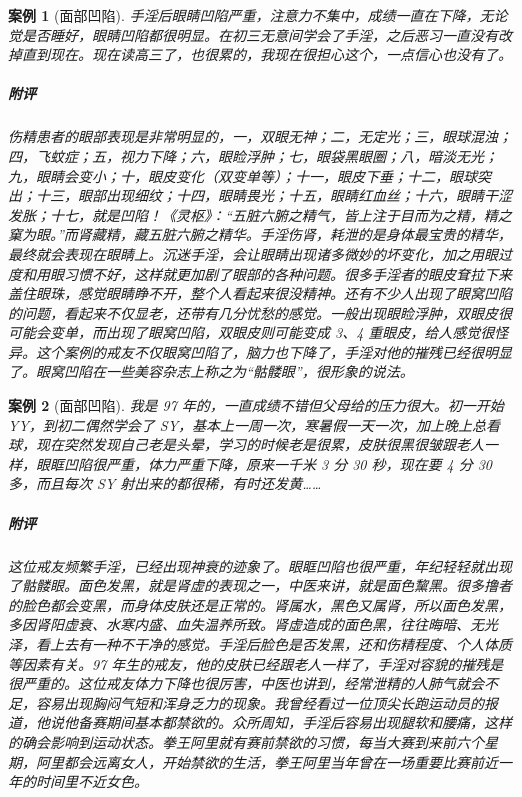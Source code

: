 \documentclass{ctexart}
\newtheorem{case}{案例}
\begin{document}
\begin{case}[面部凹陷]
    手淫后眼睛凹陷严重，注意力不集中，成绩一直在下降，无论觉是否睡好，眼睛凹陷都很明显。在初三无意间学会了手淫，之后恶习一直没有改掉直到现在。现在读高三了，也很累的，我现在很担心这个，一点信心也没有了。
    \subparagraph{附评} 伤精患者的眼部表现是非常明显的，一，双眼无神；二，无定光；三，眼球混浊；四，飞蚊症；五，视力下降；六，眼睑浮肿；七，眼袋黑眼圈；八，暗淡无光；九，眼睛会变小；十，眼皮变化（双变单等）；十一，眼皮下垂；十二，眼球突出；十三，眼部出现细纹；十四，眼睛畏光；十五，眼睛红血丝；十六，眼睛干涩发胀；十七，就是凹陷！《灵枢》：“五脏六腑之精气，皆上注于目而为之精，精之窠为眼。”而肾藏精，藏五脏六腑之精华。手淫伤肾，耗泄的是身体最宝贵的精华，最终就会表现在眼睛上。沉迷手淫，会让眼睛出现诸多微妙的坏变化，加之用眼过度和用眼习惯不好，这样就更加剧了眼部的各种问题。很多手淫者的眼皮耷拉下来盖住眼珠，感觉眼睛睁不开，整个人看起来很没精神。还有不少人出现了眼窝凹陷的问题，看起来不仅显老，还带有几分忧愁的感觉。一般出现眼睑浮肿，双眼皮很可能会变单，而出现了眼窝凹陷，双眼皮则可能变成 3、4 重眼皮，给人感觉很怪异。这个案例的戒友不仅眼窝凹陷了，脑力也下降了，手淫对他的摧残已经很明显了。眼窝凹陷在一些美容杂志上称之为“骷髅眼”，很形象的说法。
\end{case}

\begin{case}[面部凹陷]
    我是 97 年的，一直成绩不错但父母给的压力很大。初一开始 YY，到初二偶然学会了 SY，基本上一周一次，寒暑假一天一次，加上晚上总看球，现在突然发现自己老是头晕，学习的时候老是很累，皮肤很黑很皱跟老人一样，眼眶凹陷很严重，体力严重下降，原来一千米 3 分 30 秒，现在要 4 分 30 多，而且每次 SY 射出来的都很稀，有时还发黄……
    \subparagraph{附评} 这位戒友频繁手淫，已经出现神衰的迹象了。眼眶凹陷也很严重，年纪轻轻就出现了骷髅眼。面色发黑，就是肾虚的表现之一，中医来讲，就是面色黧黑。很多撸者的脸色都会变黑，而身体皮肤还是正常的。肾属水，黑色又属肾，所以面色发黑，多因肾阳虚衰、水寒内盛、血失温养所致。肾虚造成的面色黑，往往晦暗、无光泽，看上去有一种不干净的感觉。手淫后脸色是否发黑，还和伤精程度、个人体质等因素有关。97 年生的戒友，他的皮肤已经跟老人一样了，手淫对容貌的摧残是很严重的。这位戒友体力下降也很厉害，中医也讲到，经常泄精的人肺气就会不足，容易出现胸闷气短和浑身乏力的现象。我曾经看过一位顶尖长跑运动员的报道，他说他备赛期间基本都禁欲的。众所周知，手淫后容易出现腿软和腰痛，这样的确会影响到运动状态。拳王阿里就有赛前禁欲的习惯，每当大赛到来前六个星期，阿里都会远离女人，开始禁欲的生活，拳王阿里当年曾在一场重要比赛前近一年的时间里不近女色。
\end{case}
\end{document}
